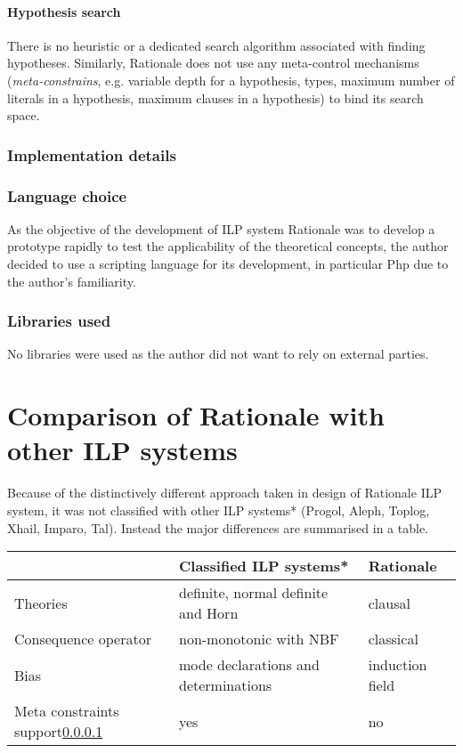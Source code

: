 \paragraph{Hypothesis search}\label{subsec:rationale_hypothesis_search}
There is no heuristic or a dedicated search algorithm associated with finding hypotheses. Similarly, Rationale does not use any meta-control mechanisms (\emph{meta-constrains}, e.g. variable depth for a hypothesis, types, maximum number of literals in a hypothesis, maximum clauses in a hypothesis) to bind its search space.

\subsubsection{Implementation details}

\subsubsection{Language choice}
As the objective of the development of ILP system Rationale was to develop a prototype rapidly to test the applicability of the theoretical concepts, the author decided to use a scripting language for its development, in particular Php due to the author's familiarity.

\subsubsection{Libraries used}
No libraries were used as the author did not want to rely on external parties.

\section{Comparison of Rationale with other ILP systems}
Because of the distinctively different approach taken in design of Rationale ILP system, it was not classified with other ILP systems* (Progol, Aleph, Toplog, Xhail, Imparo, Tal). Instead the major differences are summarised in a table.


\begin{tabular}{| l | l | l |}
\hline
 & Classified ILP systems* & Rationale \\
\hline
  Theories & definite, normal definite and Horn & clausal \\ \hline
  Consequence operator & non-monotonic with NBF & classical \\ \hline
  Bias & mode declarations and determinations & induction field \\ \hline
  Meta constraints support\ref{subsec:rationale_hypothesis_search} & yes & no\\
\hline
\end{tabular}